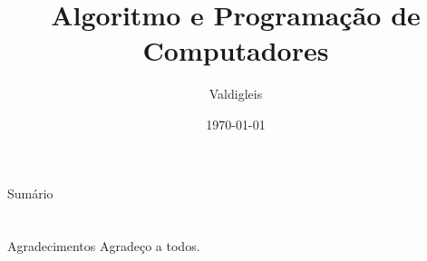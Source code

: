 \documentclass[presentation,t]{beamer}
\title[DIM0319]{Algoritmo e Programação de Computadores}
\date{\today}
\author[Valdigleis]{Valdigleis\inst{1}}
\institute[UFRN]{
	\inst{1}%
        Universidade Federal do Rio Grande do Norte\\
        Centro de Ciência Exatas e da Terra\\
        Departamento de Informática e Matemática Aplicada\\
	\url{valdigleis@dimap.ufrn.br}\\
	\vspace{0.25cm}
}
\begin{document}
\frame{\titlepage}
\section[]{}
\begin{frame}{Sumário}
	\tableofcontents
\end{frame}







\section{}
\begin{frame}{Agradecimentos}
	Agradeço a todos. 	
\end{frame}
\end{document}
